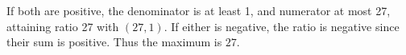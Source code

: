 If both are positive, the denominator is at least 1, and numerator at most 27, attaining ratio 27 with $(27,1)$. If either is negative, the ratio is negative since their sum is positive. Thus the maximum is $\boxed{27}$.
